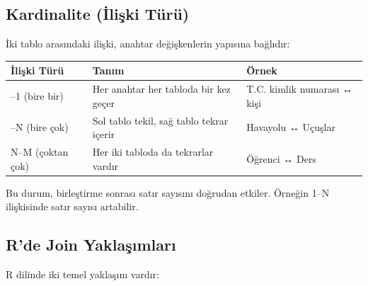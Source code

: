 \documentclass[
  letterpaper,
  DIV=11,
  numbers=noendperiod]{scrreprt}
\begin{document}
\subsection*{Kardinalite (İlişki
Türü)}\label{kardinalite-iliux15fki-tuxfcruxfc}

İki tablo arasındaki ilişki, anahtar değişkenlerin yapısına bağlıdır:

\begin{longtable}[]{@{}
  >{\raggedright\arraybackslash}p{}
  >{\raggedright\arraybackslash}p{}
  >{\raggedright\arraybackslash}p{}@{}}
\toprule\noalign{}
\begin{minipage}[b]{\linewidth}\raggedright
İlişki Türü
\end{minipage} & \begin{minipage}[b]{\linewidth}\raggedright
Tanım
\end{minipage} & \begin{minipage}[b]{\linewidth}\raggedright
Örnek
\end{minipage} \\
\midrule\noalign{}
\endhead
\bottomrule\noalign{}
\endlastfoot
1--1 (bire bir) & Her anahtar her tabloda bir kez geçer & T.C. kimlik
numarası ↔ kişi \\
1--N (bire çok) & Sol tablo tekil, sağ tablo tekrar içerir & Havayolu ↔
Uçuşlar \\
N--M (çoktan çok) & Her iki tabloda da tekrarlar vardır & Öğrenci ↔
Ders \\
\end{longtable}

Bu durum, birleştirme sonrası satır sayısını doğrudan etkiler. Örneğin
1--N ilişkisinde satır sayısı artabilir.

\subsection*{R'de Join
Yaklaşımları}\label{rde-join-yaklaux15fux131mlarux131}

R dilinde iki temel yaklaşım vardır:
\end{document}
